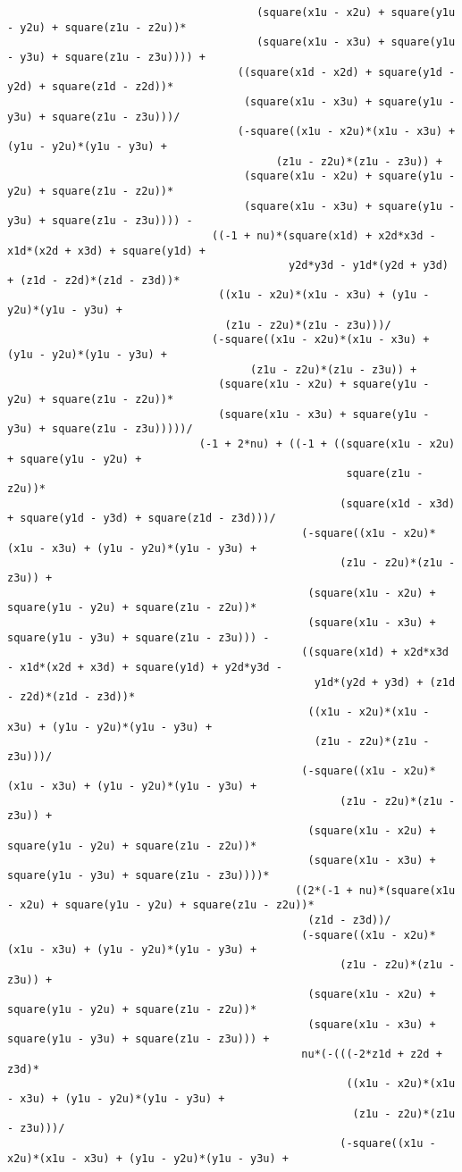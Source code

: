 \begin{lstlisting}
									   (square(x1u - x2u) + square(y1u - y2u) + square(z1u - z2u))*
									   (square(x1u - x3u) + square(y1u - y3u) + square(z1u - z3u)))) + 
									((square(x1d - x2d) + square(y1d - y2d) + square(z1d - z2d))*
									 (square(x1u - x3u) + square(y1u - y3u) + square(z1u - z3u)))/
									(-square((x1u - x2u)*(x1u - x3u) + (y1u - y2u)*(y1u - y3u) + 
										  (z1u - z2u)*(z1u - z3u)) + 
									 (square(x1u - x2u) + square(y1u - y2u) + square(z1u - z2u))*
									 (square(x1u - x3u) + square(y1u - y3u) + square(z1u - z3u)))) - 
								((-1 + nu)*(square(x1d) + x2d*x3d - x1d*(x2d + x3d) + square(y1d) + 
											y2d*y3d - y1d*(y2d + y3d) + (z1d - z2d)*(z1d - z3d))*
								 ((x1u - x2u)*(x1u - x3u) + (y1u - y2u)*(y1u - y3u) + 
								  (z1u - z2u)*(z1u - z3u)))/
								(-square((x1u - x2u)*(x1u - x3u) + (y1u - y2u)*(y1u - y3u) + 
									  (z1u - z2u)*(z1u - z3u)) + 
								 (square(x1u - x2u) + square(y1u - y2u) + square(z1u - z2u))*
								 (square(x1u - x3u) + square(y1u - y3u) + square(z1u - z3u)))))/
							  (-1 + 2*nu) + ((-1 + ((square(x1u - x2u) + square(y1u - y2u) + 
													 square(z1u - z2u))*
													(square(x1d - x3d) + square(y1d - y3d) + square(z1d - z3d)))/
											  (-square((x1u - x2u)*(x1u - x3u) + (y1u - y2u)*(y1u - y3u) + 
													(z1u - z2u)*(z1u - z3u)) + 
											   (square(x1u - x2u) + square(y1u - y2u) + square(z1u - z2u))*
											   (square(x1u - x3u) + square(y1u - y3u) + square(z1u - z3u))) - 
											  ((square(x1d) + x2d*x3d - x1d*(x2d + x3d) + square(y1d) + y2d*y3d - 
												y1d*(y2d + y3d) + (z1d - z2d)*(z1d - z3d))*
											   ((x1u - x2u)*(x1u - x3u) + (y1u - y2u)*(y1u - y3u) + 
												(z1u - z2u)*(z1u - z3u)))/
											  (-square((x1u - x2u)*(x1u - x3u) + (y1u - y2u)*(y1u - y3u) + 
													(z1u - z2u)*(z1u - z3u)) + 
											   (square(x1u - x2u) + square(y1u - y2u) + square(z1u - z2u))*
											   (square(x1u - x3u) + square(y1u - y3u) + square(z1u - z3u))))*
											 ((2*(-1 + nu)*(square(x1u - x2u) + square(y1u - y2u) + square(z1u - z2u))*
											   (z1d - z3d))/
											  (-square((x1u - x2u)*(x1u - x3u) + (y1u - y2u)*(y1u - y3u) + 
													(z1u - z2u)*(z1u - z3u)) + 
											   (square(x1u - x2u) + square(y1u - y2u) + square(z1u - z2u))*
											   (square(x1u - x3u) + square(y1u - y3u) + square(z1u - z3u))) + 
											  nu*(-(((-2*z1d + z2d + z3d)*
													 ((x1u - x2u)*(x1u - x3u) + (y1u - y2u)*(y1u - y3u) + 
													  (z1u - z2u)*(z1u - z3u)))/
													(-square((x1u - x2u)*(x1u - x3u) + (y1u - y2u)*(y1u - y3u) + 

\end{lstlisting}
